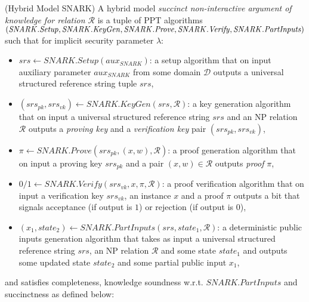 \begin{definition}(Hybrid Model SNARK)
\label{dfn_snark}
A hybrid model \emph{succinct non-interactive argument of knowledge for relation $\mathcal{R}$} is a tuple of PPT algorithms 
$(\mathit{SNARK.Setup}, \mathit{SNARK.KeyGen}, \mathit{SNARK.Prove}, \\ \mathit{SNARK.Verify}, \mathit{SNARK.PartInputs})$ 
such that for implicit security parameter $\lambda$: 

\begin{itemize}
\item $\mathit{srs} \leftarrow \mathit{SNARK.Setup} (\mathit{aux_{\mathit{SNARK}}})$: a setup algorithm that on input auxiliary parameter 
$\mathit{aux_{\mathit{SNARK}}}$ from some domain $\mathcal{D}$ outputs a universal structured reference string tuple $\mathit{srs}$, 

\item $(\mathit{srs_{pk}}, \mathit{srs_{vk}}) \leftarrow \mathit{SNARK.KeyGen}(\mathit{srs}, \mathcal{R})$: a key generation algorithm that on input a
universal structured reference string $\mathit{srs}$ and an NP relation $\mathcal{R}$ outputs a \emph{proving key} and 
a \emph{verification key} pair $(\mathit{srs_{pk}}, \mathit{srs_{vk}})$,

\item $\pi \leftarrow \mathit{SNARK.Prove}(\mathit{srs_{pk}}, (x,w), \mathcal{R})$: a proof generation algorithm that on input a proving key 
$\mathit{srs_{pk}}$ and a pair $(x,w) \in \mathcal{R}$ outputs \emph{proof} $\pi$, 

\item $0/1 \leftarrow \mathit{SNARK.Verify}(\mathit{srs_{vk}}, x, \pi, \mathcal{R})$: a proof verification algorithm that on input a verification key 
$\mathit{srs_{vk}}$, an instance $x$ and a proof $\pi$ outputs a bit that signals acceptance (if output is $1$) or rejection (if output is $0$),

\item $(x_1, \mathit{state}_2) \leftarrow \mathit{SNARK.PartInputs}(\mathit{srs}, \mathit{state}_1, \mathcal{R})$: a deterministic 
public inputs generation algorithm that takes as input a universal structured reference string $\mathit{srs}$, an NP relation $\mathcal{R}$ and 
some state $\mathit{state}_1$ and outputs some updated state $\mathit{state}_2$ and some partial public input $x_1$,

\end{itemize}
and satisfies completeness, knowledge soundness w.r.t. $\mathit{SNARK.PartInputs}$ and succinctness as defined below:


\end{definition}
